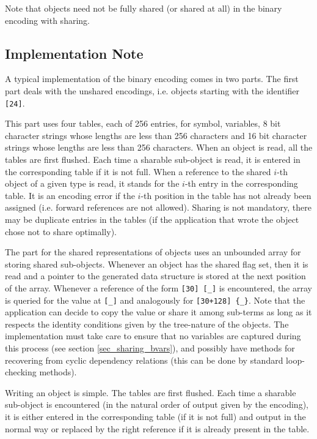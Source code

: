 Note that objects need not be fully shared (or shared at all) in the binary encoding with
sharing.

\subsection{Implementation Note}\label{sec_impl_note}
  
A typical implementation of the binary encoding comes in two parts. The first part deals
with the unshared encodings, i.e. objects starting with the identifier \lstinline|[24]|.
  
This part uses four tables, each of 256 entries, for symbol, variables, 8 bit character
strings whose lengths are less than 256 characters and 16 bit character strings whose
lengths are less than 256 characters.  When an object is read, all the tables are first
flushed. Each time a sharable sub-object is read, it is entered in the corresponding table
if it is not full. When a reference to the shared $i$-th object of a given type is read,
it stands for the $i$-th entry in the corresponding table. It is an encoding error if the
$i$-th position in the table has not already been assigned (i.e. forward references are
not allowed).  Sharing is not mandatory, there may be duplicate entries in the tables (if
the application that wrote the object chose not to share optimally).
  
The part for the shared representations of \OM objects uses an unbounded array for storing
shared sub-objects. Whenever an object has the shared flag set, then it is read and a
pointer to the generated data structure is stored at the next position of the
array. Whenever a reference of the form \lstinline|[30] [_]| is encountered, the array is
queried for the value at \lstinline|[_]| and analogously for \lstinline|[30+128] {_}|. 
Note that the application can decide to copy the value or share it among sub-terms
as long as it respects the identity conditions given by the tree-nature of the \OM
objects.  The implementation must take care to ensure that no variables are captured
during this process (see section \ref{sec_sharing_bvars}), and possibly have methods for
recovering from cyclic dependency relations (this can be done by standard loop-checking
methods).
  
Writing an object is simple. The tables are first flushed. Each time a sharable sub-object
is encountered (in the natural order of output given by the encoding), it is either
entered in the corresponding table (if it is not full) and output in the normal way or
replaced by the right reference if it is already present in the table.

